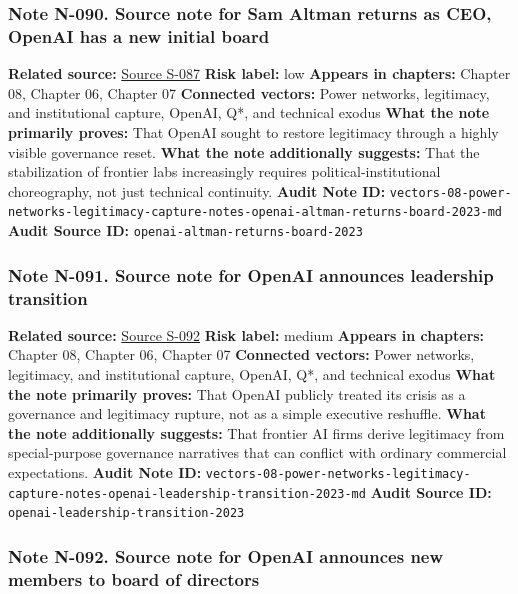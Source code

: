 \documentclass[
  american,
  11pt,
  letterpaper,
]{article}
\begin{document}
\subsubsection{Note N-090. Source note for Sam Altman returns as CEO,
OpenAI has a new initial
board}\label{note-n-090-vectors-08-power-networks-legitimacy-capture-notes-openai-altman-returns-board-2023-md}

\textbf{Related source:}
\hyperref[source-s-087-sam-altman-returns-as-ceo-openai-has-a-new-initial-board]{Source
S-087} \textbf{Risk label:} low \textbf{Appears in chapters:} Chapter
08, Chapter 06, Chapter 07 \textbf{Connected vectors:} Power networks,
legitimacy, and institutional capture, OpenAI, Q*, and technical exodus
\textbf{What the note primarily proves:} That OpenAI sought to restore
legitimacy through a highly visible governance reset. \textbf{What the
note additionally suggests:} That the stabilization of frontier labs
increasingly requires political-institutional choreography, not just
technical continuity. \textbf{Audit Note ID:}
\texttt{vectors-08-power-networks-legitimacy-capture-notes-openai-altman-returns-board-2023-md}
\textbf{Audit Source ID:} \texttt{openai-altman-returns-board-2023}

\subsubsection{Note N-091. Source note for OpenAI announces leadership
transition}\label{note-n-091-vectors-08-power-networks-legitimacy-capture-notes-openai-leadership-transition-2023-md}

\textbf{Related source:}
\hyperref[source-s-092-openai-announces-leadership-transition]{Source
S-092} \textbf{Risk label:} medium \textbf{Appears in chapters:} Chapter
08, Chapter 06, Chapter 07 \textbf{Connected vectors:} Power networks,
legitimacy, and institutional capture, OpenAI, Q*, and technical exodus
\textbf{What the note primarily proves:} That OpenAI publicly treated
its crisis as a governance and legitimacy rupture, not as a simple
executive reshuffle. \textbf{What the note additionally suggests:} That
frontier AI firms derive legitimacy from special-purpose governance
narratives that can conflict with ordinary commercial expectations.
\textbf{Audit Note ID:}
\texttt{vectors-08-power-networks-legitimacy-capture-notes-openai-leadership-transition-2023-md}
\textbf{Audit Source ID:} \texttt{openai-leadership-transition-2023}

\subsubsection{Note N-092. Source note for OpenAI announces new members
to board of
directors}\label{note-n-092-vectors-08-power-networks-legitimacy-capture-notes-openai-new-board-members-2024-md}
\end{document}
